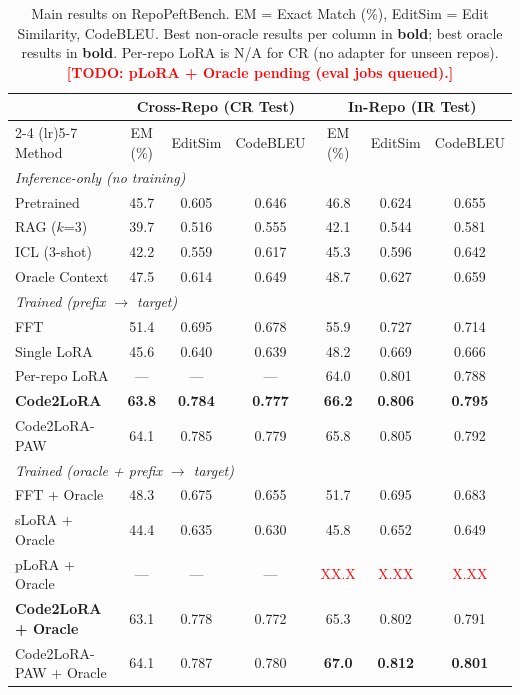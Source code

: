 \documentclass[11pt]{article}
\newcommand{\method}{Code2LoRA}
\newcommand{\benchmark}{RepoPeftBench}
\newcommand{\todo}[1]{\textcolor{red}{\textbf{[TODO: #1]}}}
\newcommand{\todoinline}[1]{\textcolor{red}{#1}}
\begin{document}
\begin{table}[t]
\centering
\small
\begin{tabular}{l@{\hskip 8pt}ccc@{\hskip 12pt}ccc}
\toprule
& \multicolumn{3}{c}{\textbf{Cross-Repo (CR Test)}} & \multicolumn{3}{c}{\textbf{In-Repo (IR Test)}} \\
\cmidrule(lr){2-4} \cmidrule(lr){5-7}
Method & EM (\%) & EditSim & CodeBLEU & EM (\%) & EditSim & CodeBLEU \\
\midrule
\multicolumn{7}{l}{\emph{Inference-only (no training)}} \\
\midrule
Pretrained & 45.7 & 0.605 & 0.646 & 46.8 & 0.624 & 0.655 \\
RAG ($k$=3) & 39.7 & 0.516 & 0.555 & 42.1 & 0.544 & 0.581 \\
ICL (3-shot) & 42.2 & 0.559 & 0.617 & 45.3 & 0.596 & 0.642 \\
Oracle Context & 47.5 & 0.614 & 0.649 & 48.7 & 0.627 & 0.659 \\
\midrule
\multicolumn{7}{l}{\emph{Trained (prefix $\to$ target)}} \\
\midrule
FFT & 51.4 & 0.695 & 0.678 & 55.9 & 0.727 & 0.714 \\
Single LoRA & 45.6 & 0.640 & 0.639 & 48.2 & 0.669 & 0.666 \\
Per-repo LoRA & --- & --- & --- & 64.0 & 0.801 & 0.788 \\
\textbf{\method{}} & \textbf{63.8} & \textbf{0.784} & \textbf{0.777} & \textbf{66.2} & \textbf{0.806} & \textbf{0.795} \\
\method{}-PAW & 64.1 & 0.785 & 0.779 & 65.8 & 0.805 & 0.792 \\
\midrule
\multicolumn{7}{l}{\emph{Trained (oracle + prefix $\to$ target)}} \\
\midrule
FFT + Oracle & 48.3 & 0.675 & 0.655 & 51.7 & 0.695 & 0.683 \\
sLoRA + Oracle & 44.4 & 0.635 & 0.630 & 45.8 & 0.652 & 0.649 \\
pLoRA + Oracle & --- & --- & --- & \todoinline{XX.X} & \todoinline{X.XX} & \todoinline{X.XX} \\
\textbf{\method{} + Oracle} & 63.1 & 0.778 & 0.772 & 65.3 & 0.802 & 0.791 \\
\method{}-PAW + Oracle & 64.1 & 0.787 & 0.780 & \textbf{67.0} & \textbf{0.812} & \textbf{0.801} \\
\bottomrule
\end{tabular}
\caption{Main results on \benchmark{}. EM = Exact Match (\%), EditSim = Edit Similarity, CodeBLEU. Best non-oracle results per column in \textbf{bold}; best oracle results in \textbf{bold}. Per-repo LoRA is N/A for CR (no adapter for unseen repos). \todo{pLoRA + Oracle pending (eval jobs queued).}}
\label{tab:main_results}
\end{table}
\end{document}
